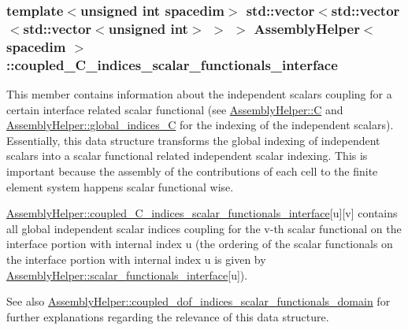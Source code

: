 \subsubsection[{\texorpdfstring{coupled\+\_\+\+C\+\_\+indices\+\_\+scalar\+\_\+functionals\+\_\+interface}{coupled_C_indices_scalar_functionals_interface}}]{\setlength{\rightskip}{0pt plus 5cm}template$<$unsigned int spacedim$>$ std\+::vector$<$std\+::vector$<$std\+::vector$<$unsigned int$>$ $>$ $>$ {\bf Assembly\+Helper}$<$ spacedim $>$\+::coupled\+\_\+\+C\+\_\+indices\+\_\+scalar\+\_\+functionals\+\_\+interface\hspace{0.3cm}{\ttfamily [private]}}\hypertarget{class_assembly_helper_a311e176038ee2b7ca0719abb384ca57b}{}\label{class_assembly_helper_a311e176038ee2b7ca0719abb384ca57b}
This member contains information about the independent scalars coupling for a certain interface related scalar functional (see \hyperlink{class_assembly_helper_aa5234a46be82cfe7d92678169d38f326}{Assembly\+Helper\+::C} and \hyperlink{class_assembly_helper_a9a8f0e8ea8c67ce9429c16a2017cafdc}{Assembly\+Helper\+::global\+\_\+indices\+\_\+C} for the indexing of the independent scalars). Essentially, this data structure transforms the global indexing of independent scalars into a scalar functional related independent scalar indexing. This is important because the assembly of the contributions of each cell to the finite element system happens scalar functional wise.

\hyperlink{class_assembly_helper_a311e176038ee2b7ca0719abb384ca57b}{Assembly\+Helper\+::coupled\+\_\+\+C\+\_\+indices\+\_\+scalar\+\_\+functionals\+\_\+interface}\mbox{[}{\ttfamily u}\mbox{]}\mbox{[}{\ttfamily v}\mbox{]} contains all global independent scalar indices coupling for the {\ttfamily v-\/th} scalar functional on the interface portion with internal index {\ttfamily u} (the ordering of the scalar functionals on the interface portion with internal index {\ttfamily u} is given by \hyperlink{class_assembly_helper_a29aa77e0e8e6b35c94966ea88840e462}{Assembly\+Helper\+::scalar\+\_\+functionals\+\_\+interface}\mbox{[}{\ttfamily u}\mbox{]}).

See also \hyperlink{class_assembly_helper_a1a26b40224e3f04e5168accc91486493}{Assembly\+Helper\+::coupled\+\_\+dof\+\_\+indices\+\_\+scalar\+\_\+functionals\+\_\+domain} for further explanations regarding the relevance of this data structure.

